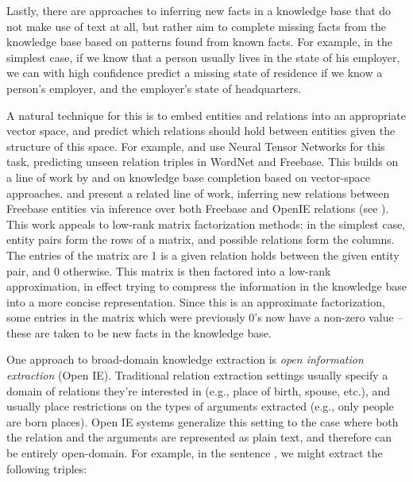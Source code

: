 Lastly, there are approaches to inferring new facts in a knowledge base that do not
  make use of text at all, but rather aim to complete missing facts from the knowledge
  base based on patterns found from known facts.
For example, in the simplest case, if we know that a person usually lives in the state 
  of his employer, we can with high confidence predict a missing state of residence if
  we know a person's employer, and the employer's state of headquarters.

A natural technique for this is to embed entities and relations into an
  appropriate vector space, and predict which relations should hold 
  between entities given the structure of this space.
For example,  and 
  use Neural Tensor Networks for this task, predicting unseen relation triples in
  WordNet and Freebase.
This builds on a line of work by
   and
   on knowledge base completion based on vector-space
  approaches.
 and 
  present a related line of work, inferring new relations between
  Freebase entities via inference over both Freebase and
  OpenIE relations (see ).
This work appeals to low-rank matrix factorization methods:
  in the simplest case, entity pairs form the rows of a matrix, and possible relations
  form the columns.
The entries of the matrix are 1 is a given relation holds between the given entity pair,
  and 0 otherwise.
This matrix is then factored into a low-rank approximation, in effect trying to compress
  the information in the knowledge base into a more concise representation.
Since this is an approximate factorization, some entries in the matrix which were previously
  0's now have a non-zero value -- these are taken to be new facts in the knowledge base.



%
%
One approach to broad-domain knowledge extraction is \textit{open information extraction} (Open IE).
Traditional relation extraction settings usually specify a domain of relations they're
  interested in (e.g., place of birth, spouse, etc.), and usually place restrictions on the
  types of arguments extracted (e.g., only people are born places).
Open IE systems generalize this setting to the case where both the relation and the arguments
  are represented as plain text, and therefore can be entirely open-domain.
For example, in the sentence , we might extract
  the following triples:

